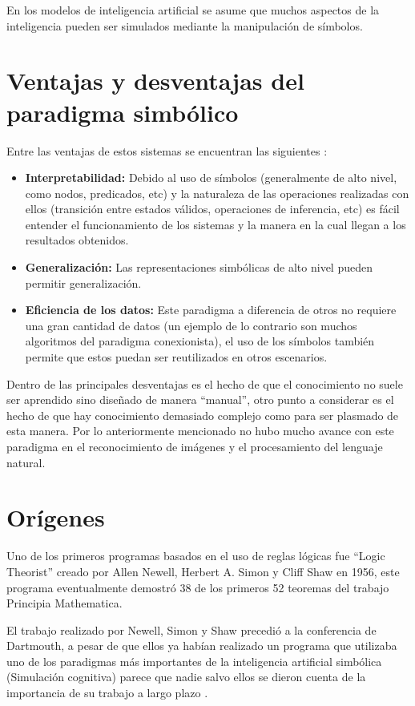 \documentclass[11pt,fleqn]{book} %
\begin{document}
En los modelos de inteligencia artificial se asume que muchos aspectos de la inteligencia pueden ser simulados mediante la manipulación de símbolos.

\section{Ventajas y desventajas del paradigma simbólico} 

Entre las ventajas de estos sistemas se encuentran las siguientes \cite{GARNELO201917}:
\begin{itemize}
\item \textbf{Interpretabilidad:} Debido al uso de símbolos (generalmente de alto nivel, como nodos, predicados, etc) y la naturaleza de las operaciones realizadas con ellos (transición entre estados válidos, operaciones de inferencia, etc) es fácil entender el funcionamiento de los sistemas y la manera en la cual llegan a los resultados obtenidos.
\item \textbf{Generalización:} Las representaciones simbólicas de alto nivel pueden permitir generalización.
\item \textbf{Eficiencia de los datos:} Este paradigma a diferencia de otros no requiere una gran cantidad de datos (un ejemplo de lo contrario son muchos algoritmos del paradigma conexionista), el uso de los símbolos también permite que estos puedan ser reutilizados en otros escenarios.
\end{itemize}

Dentro de las principales desventajas es el hecho de que el conocimiento no suele ser aprendido sino diseñado de manera “manual”, otro punto a considerar es el hecho de que hay conocimiento demasiado complejo como para ser plasmado de esta manera. Por lo anteriormente mencionado no hubo mucho avance con este paradigma en el reconocimiento de imágenes y el procesamiento del lenguaje natural.

\section{Orígenes} 

Uno de los primeros programas basados en el uso de reglas lógicas fue “Logic Theorist” creado por Allen Newell, Herbert A. Simon y Cliff Shaw en 1956, este programa eventualmente demostró 38 de los primeros 52 teoremas del trabajo Principia Mathematica. 

El trabajo realizado por Newell, Simon y Shaw precedió a la conferencia de Dartmouth, a pesar de que ellos ya habían realizado un programa que utilizaba uno de los paradigmas más importantes de la inteligencia artificial simbólica (Simulación cognitiva) parece que nadie salvo ellos se dieron cuenta de la importancia de su trabajo a largo plazo \cite{mccorduck2004machines}.
\end{document}

